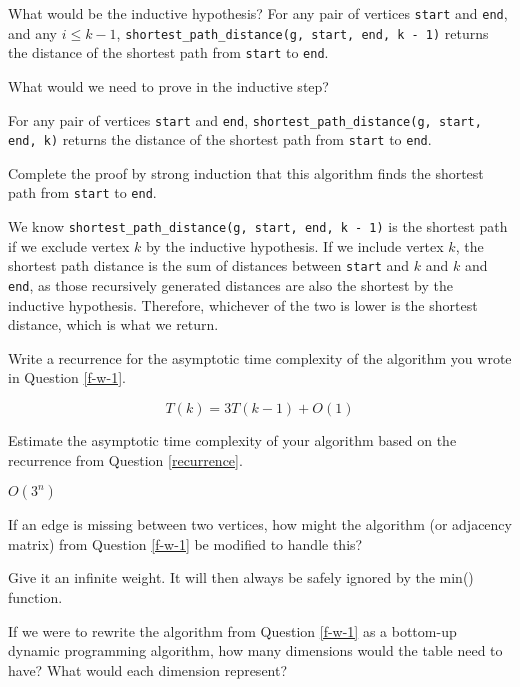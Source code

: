 \documentclass{tufte-handout}
\begin{document}
\begin{questions}
\item What would be the inductive hypothesis? {\color{red} 
For any pair of vertices \verb|start| and \verb|end|, and any $i \le k - 1$, \verb|shortest_path_distance(g, start, end, k - 1)| returns the distance of the shortest path from \verb|start| to \verb|end|.}

\item What would we need to prove in the inductive step?

{\color{red} 
For any pair of vertices \verb|start| and \verb|end|, \verb|shortest_path_distance(g, start, end, k)| returns the distance of the shortest path from \verb|start| to \verb|end|.}

\item Complete the proof by strong induction that this algorithm finds the shortest path from \verb|start| to \verb|end|.

{\color{red} We know \verb|shortest_path_distance(g, start, end, k - 1)| is the shortest path if we exclude vertex $k$ by the inductive hypothesis. If we include vertex $k$, the shortest path distance is the sum of distances between \verb|start| and $k$ and $k$ and \verb|end|, as those recursively generated distances are also the shortest by the inductive hypothesis. Therefore, whichever of the two is lower is the shortest distance, which is what we return.
}

\item Write a recurrence for the asymptotic time complexity of the algorithm you wrote in Question \ref{f-w-1}. \label{recurrence}

{\color{red} \[T(k) = 3T(k-1) + O(1) \]}

\item Estimate the asymptotic time complexity of your algorithm based on the recurrence from Question \ref{recurrence}.

{\color{red} $O(3^n)$}

\item If an edge is missing between two vertices, how might the algorithm (or adjacency matrix) from Question \ref{f-w-1} be modified to handle this?

{\color{red} Give it an infinite weight. It will then always be safely ignored by the min() function.}

\item If we were to rewrite the algorithm from Question \ref{f-w-1} as a bottom-up dynamic programming algorithm, how many dimensions would the table need to have? What would each dimension represent?


\end{questions}
\end{document}
